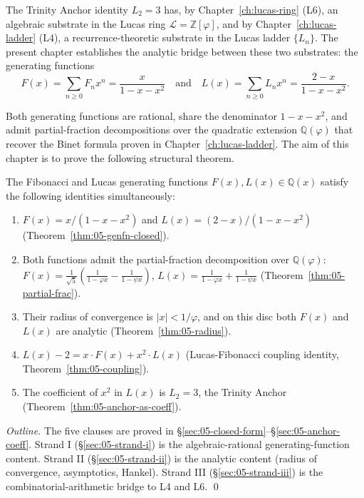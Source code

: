 The Trinity Anchor identity $L_2 = 3$ has, by Chapter~\ref{ch:lucas-ring}
(L6), an algebraic substrate in the Lucas ring $\mathcal{L}=\mathbb{Z}[\varphi]$,
and by Chapter~\ref{ch:lucas-ladder} (L4), a recurrence-theoretic
substrate in the Lucas ladder $\{L_n\}$. The present chapter establishes
the analytic bridge between these two substrates: the generating
functions
\[
  F(x) = \sum_{n \ge 0} F_n x^n = \frac{x}{1 - x - x^2}
  \quad\text{and}\quad
  L(x) = \sum_{n \ge 0} L_n x^n = \frac{2 - x}{1 - x - x^2}.
\]

Both generating functions are rational, share the denominator
$1 - x - x^2$, and admit partial-fraction decompositions over the
quadratic extension $\mathbb{Q}(\varphi)$ that recover the Binet formula
proven in Chapter~\ref{ch:lucas-ladder}. The aim of this chapter is to
prove the following structural theorem.

\begin{theorem}
\label{thm:05-bridge}
The Fibonacci and Lucas generating functions $F(x), L(x) \in \mathbb{Q}(x)$
satisfy the following identities simultaneously:
\begin{enumerate}
  \item $F(x) = x / (1 - x - x^2)$ and $L(x) = (2 - x)/(1 - x - x^2)$
        (Theorem~\ref{thm:05-genfn-closed}).
  \item Both functions admit the partial-fraction decomposition over
        $\mathbb{Q}(\varphi)$:
        $F(x) = \frac{1}{\sqrt{5}}\left(\frac{1}{1 - \varphi x} - \frac{1}{1 - \psi x}\right)$,
        $L(x) = \frac{1}{1 - \varphi x} + \frac{1}{1 - \psi x}$
        (Theorem~\ref{thm:05-partial-frac}).
  \item Their radius of convergence is $|x| < 1/\varphi$, and on this
        disc both $F(x)$ and $L(x)$ are analytic
        (Theorem~\ref{thm:05-radius}).
  \item $L(x) - 2 = x \cdot F(x) + x^2 \cdot L(x)$ (Lucas-Fibonacci coupling
        identity, Theorem~\ref{thm:05-coupling}).
  \item The coefficient of $x^2$ in $L(x)$ is $L_2 = 3$, the Trinity Anchor
        (Theorem~\ref{thm:05-anchor-as-coeff}).
\end{enumerate}
\end{theorem}

\begin{proof}[Outline]
The five clauses are proved in §\ref{sec:05-closed-form}–§\ref{sec:05-anchor-coeff}.
Strand I (§\ref{sec:05-strand-i}) is the algebraic-rational generating-function
content. Strand II (§\ref{sec:05-strand-ii}) is the analytic content
(radius of convergence, asymptotics, Hankel). Strand III (§\ref{sec:05-strand-iii})
is the combinatorial-arithmetic bridge to L4 and L6. \qed
\end{proof}

